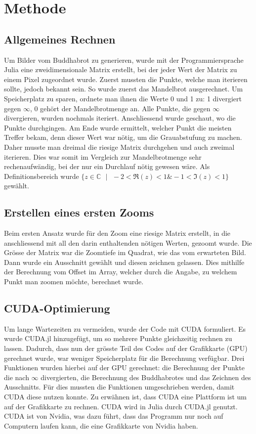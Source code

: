 \section{Methode}
\subsection{Allgemeines Rechnen}
Um Bilder vom Buddhabrot zu generieren, wurde mit der Programmiersprache Julia eine zweidimensionale Matrix erstellt, bei der jeder Wert der Matrix zu einem Pixel zugeordnet wurde. Zuerst mussten die Punkte, welche man iterieren sollte, jedoch bekannt sein. So wurde zuerst das Mandelbrot ausgerechnet. Um Speicherplatz zu sparen, ordnete man ihnen die Werte 0 und 1 zu: 1 divergiert gegen $\infty$, 0 gehört der Mandelbrotmenge an. Alle Punkte, die gegen $\infty$ divergieren, wurden nochmals iteriert. Anschliessend wurde geschaut, wo die Punkte durchgingen. Am Ende wurde ermittelt, welcher Punkt die meisten Treffer bekam, denn dieser Wert war nötig, um die Grauabstufung zu machen. Daher musste man dreimal die riesige Matrix durchgehen und auch zweimal iterieren. Dies war somit im Vergleich zur Mandelbrotmenge sehr rechenaufwändig, bei der nur ein Durchlauf nötig gewesen wäre. Als Definitionsbereich wurde $\{z \in \mathbb{C}\text{ }|\text{ }-2 < \Re(z) < 1 \& -1 < \Im(z) < 1\}$ gewählt.
\subsection{Erstellen eines ersten Zooms}
Beim ersten Ansatz wurde für den Zoom eine riesige Matrix erstellt, in die anschliessend mit all den darin enthaltenden nötigen Werten, gezoomt wurde. Die Grösse der Matrix war die Zoomtiefe im Quadrat, wie das vom erwarteten Bild. Dann wurde ein Ausschnitt gewählt und diesen zeichnen gelassen. Dies mithilfe der Berechnung vom Offset im Array, welcher durch die Angabe, zu welchem Punkt man zoomen möchte, berechnet wurde.
\subsection{CUDA-Optimierung}
Um lange Wartezeiten zu vermeiden, wurde der Code mit CUDA formuliert. Es wurde CUDA.jl hinzugefügt, um so mehrere Punkte gleichzeitig rechnen zu lassen. Dadurch, dass nun der grösste Teil des Codes auf der Grafikkarte (GPU) gerechnet wurde, war weniger Speicherplatz für die Berechnung verfügbar. Drei Funktionen wurden hierbei auf der GPU gerechnet: die Berechnung der Punkte die nach $\infty$ divergierten, die Berechnung des Buddhabrotes und das Zeichnen des Ausschnitts. Für dies mussten die Funktionen umgeschrieben werden, damit CUDA diese nutzen konnte. Zu erwähnen ist, dass CUDA eine Plattform ist um auf der Grafikkarte zu rechnen. CUDA wird in Julia durch CUDA.jl genutzt. CUDA ist von Nvidia, was dazu führt, dass das Programm nur noch auf Computern laufen kann, die eine Grafikkarte von Nvidia haben.
